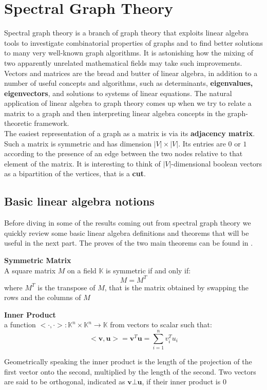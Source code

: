 
\section{Spectral Graph Theory}
Spectral graph theory is a branch of graph theory that exploits linear algebra tools to investigate combinatorial properties of graphs and to find better solutions to many very well-known graph algorithms. It is astonishing how the mixing of two apparently unrelated mathematical fields may take such improvements. \\
Vectors and matrices are the bread and butter of linear algebra, in addition to a number of useful concepts and algorithms, such as determinants, \textbf{eigenvalues, eigenvectors}, and solutions to systems of linear equations.
The natural application of linear algebra to graph theory comes up when we try to relate a matrix to a graph and then interpreting linear algebra concepts in the graph-theoretic framework.\\
The easiest representation of a graph as a matrix is via its \textbf{adjacency matrix}. Such a matrix is symmetric and has dimension $ |V| \times |V| $. Its entries are $ 0 $ or $ 1 $ according to the presence of an edge between the two nodes relative to that element of the matrix.
It is interesting to think of $ |V| $-dimensional boolean vectors as a bipartition of the vertices, that is a \textbf{cut}.  

\subsection{Basic linear algebra notions}
Before diving in some of the results coming out from spectral graph theory we quickly review some basic linear algebra definitions and theorems that will be useful in the next part.
The proves of the two main theorems can be found in \cite{trevi-notes}.

\begin{definition}{\textbf{Symmetric Matrix}} \\
	A square matrix $ M $ on a field $ \mathbb{K} $ is symmetric if and only if:
	\[ M = M^T \]
	where $ M^T $ is the transpose of $ M $, that is the matrix obtained by swapping the rows and the columns of $ M $
\end{definition}

\begin{definition}{\textbf{Inner Product}} \\
a function $ <\cdot,\cdot> : \mathbb{K}^n \times \mathbb{K}^n \longrightarrow \mathbb{K}$ from vectors to scalar such that:
\[ <\mathbf{v},\mathbf{u}> = \mathbf{v}^T\mathbf{u} = \sum_{i=1}^{n}v_{i}^{T}u_i \]
\end{definition}
Geometrically speaking the inner product is the length of the projection of the first vector onto the second, multiplied by the length of the second.
Two vectors are said to be orthogonal, indicated as $ \mathbf{v} \bot \mathbf{u} $, if their inner product is 0


